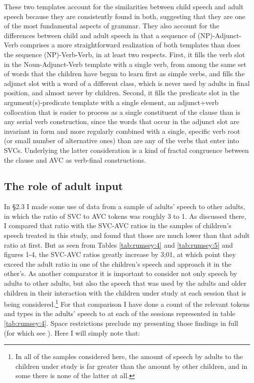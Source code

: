\documentclass[output=paper]{langsci/langscibook}
\begin{document}
These two templates account for the similarities between child speech and adult speech because they are consistently found in both, suggesting that they are one of the most fundamental aspects of  grammar. They also account for the differences between child and adult speech in that a sequence of (NP)-Adjunct-Verb comprises a more straightforward realization of both templates than does the sequence (NP)-Verb-Verb, in at least two respects. First, it fills the verb slot in the Noun-Adjunct-Verb template with a single verb, from among the same set of words that the children have begun to learn first as simple verbs, and fills the adjunct slot with a word of a different class, which is never used by adults in final position, and almost never by children.  Second, it fills the predicate slot in the argument(s)-predicate template with a single element, an adjunct+verb collocation that is easier to process as a single constituent of the clause than is any serial verb construction, since the words that occur in the adjunct slot are invariant in form and more regularly combined with a single, specific verb root (or small number of alternative ones) than are any of the verbs that enter into SVCs. Underlying the latter consideration is a kind of fractal congruence between the  clause and AVC as verb-final constructions.   

\subsection{The role of adult input}

In §2.3 I made some use of data from a sample of adults’ speech to other adults, in which the ratio of SVC to AVC tokens was roughly 3 to 1. As discussed there, I compared that ratio with the SVC-AVC ratios in the samples of children’s speech treated in this study, and found that those are much lower than that adult ratio at first. But as seen from Tables \ref{tab:rumsey:4} and \ref{tab:rumsey:5} and figures 1-4, the SVC-AVC ratios greatly increase by 3;01, at which point they exceed the adult ratio in one of the children’s speech and approach it in the other’s. As another comparator it is important to consider not only speech by adults to other adults, but also the speech that was used by the adults and older children in their interaction with the children under study at each session that is being considered.\footnote{In all of the samples considered here, the amount of speech by adults to the children under study is far greater than the amount by other children, and in some there is none of the latter at all.} For that comparison I have done a count of the relevant tokens and types in the adults’ speech to  at each of the sessions represented in table \ref{tab:rumsey:4}. Space restrictions preclude my presenting those findings in full (for which see \citealt{MerlanForthcoming}). Here I will simply note that:
\end{document}
